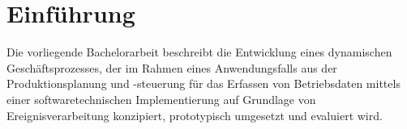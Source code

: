 \chapter{Einführung}\label{ch:einleitung}
Die vorliegende Bachelorarbeit beschreibt die Entwicklung eines dynamischen Geschäftsprozesses, der im Rahmen eines Anwendungsfalls aus der Produktionsplanung und -steuerung für das Erfassen von Betriebsdaten mittels einer softwaretechnischen Implementierung auf Grundlage von Ereignisverarbeitung konzipiert, prototypisch umgesetzt und  evaluiert wird.





